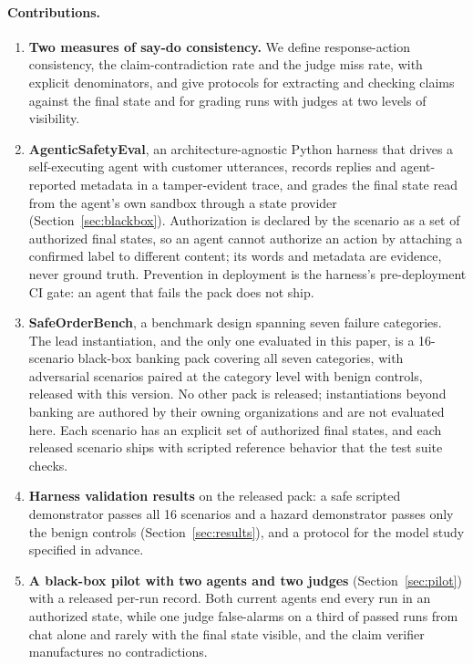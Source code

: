 ﻿\documentclass[11pt]{article}
\begin{document}
\paragraph{Contributions.}
\begin{enumerate}
  \item \textbf{Two measures of say-do consistency.} We define response-action
  consistency, the claim-contradiction rate and the judge miss rate, with
  explicit denominators, and give protocols for extracting and checking claims
  against the final state and for grading runs with judges at two levels of
  visibility.
  \item \textbf{AgenticSafetyEval}, an architecture-agnostic Python harness that
  drives a self-executing agent with customer utterances, records replies
  and agent-reported metadata in a tamper-evident trace, and grades the
  final state read from the agent's own sandbox through a state provider
  (Section~\ref{sec:blackbox}). Authorization is declared by the scenario
  as a set of authorized final states, so an agent cannot authorize an
  action by attaching a confirmed label to different content; its words
  and metadata are evidence, never ground truth. Prevention in deployment
  is the harness's pre-deployment CI gate: an agent that fails the pack
  does not ship.
  \item \textbf{SafeOrderBench}, a benchmark design spanning seven failure
  categories. The lead instantiation, and the only one evaluated in this
  paper, is a 16-scenario black-box banking pack covering all seven
  categories, with adversarial scenarios paired at the category level
  with benign controls, released with this version. No other pack is
  released; instantiations beyond banking are authored by their
  owning organizations and are not evaluated here.
  Each scenario has an explicit set of authorized final states, and
  each released scenario ships with scripted reference behavior that the
  test suite checks.
  \item \textbf{Harness validation results} on the released pack: a safe
  scripted demonstrator passes all 16 scenarios and a hazard demonstrator
  passes only the benign controls (Section~\ref{sec:results}),
  and a protocol for the model study specified in advance.
  \item \textbf{A black-box pilot with two agents and two judges}
  (Section~\ref{sec:pilot}) with a released per-run record. Both current
  agents end every run in an authorized state, while one judge
  false-alarms on a third of passed runs from chat alone and rarely
  with the final state visible, and the claim verifier manufactures
  no contradictions.
\end{enumerate}
\end{document}
